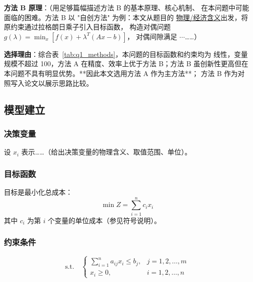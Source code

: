 \textbf{方法 B 原理}：（用足够篇幅描述方法 B 的基本原理、核心机制、
在本问题中可能面临的困难。方法 B 以 "自创方法" 为例：本文从题目的
\underline{物理/经济含义}出发，将原约束通过拉格朗日乘子引入目标函数，
构造对偶问题 $g(\lambda) = \min_x [f(x) + \lambda^T (Ax-b)]$，
对偶间隙满足 $\cdots$……）

\textbf{选择理由}：综合表~\ref{tab:q1_methods}，本问题的目标函数和约束均为
线性，变量规模不超过 100，方法 A 在精度、效率上优于方法 B；方法 B
虽创新性更高但在本问题不具有明显优势。**因此本文选用方法 A 作为主方法**；
方法 B 作为对照写入论文以展示思路比较。


\subsection{模型建立}

\subsubsection{决策变量}

设 $x_i$ 表示……（给出决策变量的物理含义、取值范围、单位）。

\subsubsection{目标函数}

目标是最小化总成本：
\begin{equation}
  \min Z = \sum_{i=1}^{n} c_i x_i
  \label{eq:q1_obj}
\end{equation}
其中 $c_i$ 为第 $i$ 个变量的单位成本（参见符号说明）。

\subsubsection{约束条件}

\begin{equation}
  \text{s.t.} \quad
  \begin{cases}
    \sum_{i=1}^{n} a_{ij} x_i \leq b_j, & j = 1, 2, \ldots, m \\
    x_i \geq 0, & i = 1, 2, \ldots, n
  \end{cases}
  \label{eq:q1_cons}
\end{equation}

